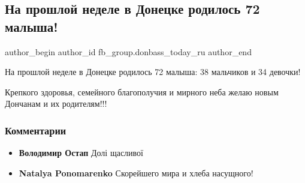  
 
 
 
 
 
\subsection{На прошлой неделе в Донецке родилось 72 малыша!}
\label{sec:07_12_2020.fb.fb_group.donbass_today_ru.4.deti_rodilis}
\ifcmt
	author_begin
   author_id fb_group.donbass_today_ru
	author_end
\fi

На прошлой неделе в Донецке родилось 72 малыша: 38 мальчиков и 34 девочки!

Крепкого здоровья, семейного благополучия и мирного неба желаю новым Дончанам и
их родителям!!!

\subsubsection{Комментарии}

\begin{itemize}
\item \textbf{Володимир Остап}
Долі щасливої

\item \textbf{Natalya Ponomarenko}
Скорейшего мира и хлеба насущного!
\end{itemize}

